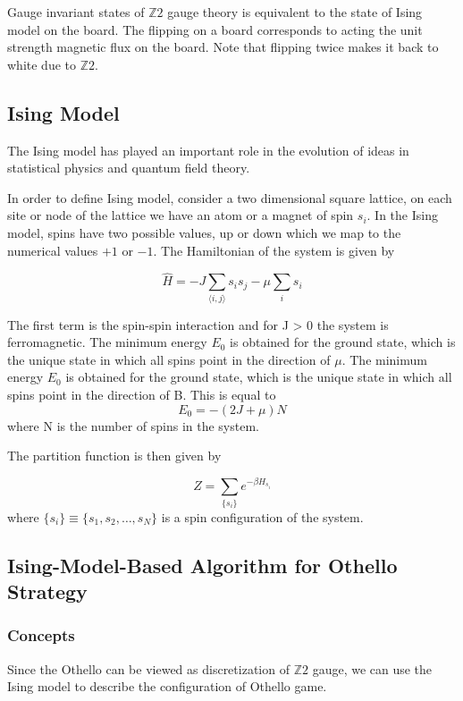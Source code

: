 \documentclass[aps,pra,preprint,amsmath,amssymb,floatfix]{revtex4-2}
\begin{document}
Gauge invariant states of $\mathbb{Z}2$ gauge theory is equivalent to the state of Ising model on the board. The flipping on a board corresponds to acting the unit strength magnetic flux on the board. Note that flipping twice makes it back to white due to $\mathbb{Z}2$. \cite{PhysRevD.96.126001}

\subsection{Ising Model}
The Ising model has played an important role in the evolution of ideas in statistical physics and quantum field theory. 

In order to define Ising model, consider a two dimensional square lattice, on each site or node of the lattice we have an atom or a magnet of spin $s_i$. In the Ising model, spins have two possible values, up or down which we map to the numerical values $+1$ or $-1$. The Hamiltonian of the system is given by

\begin{equation}
    \hat{H}=-J\sum_{\langle i,j\rangle}s_is_j-\mu\sum_is_i
\end{equation}

The first term is the spin-spin interaction and for J > 0 the system is ferromagnetic. The minimum energy $E_0$ is obtained for the ground state, which is the unique state in which all spins point in the direction of $\mu$. The minimum energy $E_0$ is obtained for the ground state, which is the unique state in which all spins point in the direction of B. This is equal to
\begin{equation}
    E_0=-(2J+\mu)N
\end{equation}
where N is the number of spins in the system.

The partition function is then given by

\begin{equation}
    Z=\sum_{\{s_i\}}e^{-\beta H_{s_i}}
\end{equation}
where $\{s_i\}\equiv \{s_1,s_2,\dots,s_N\}$ is a spin configuration of the system.

\subsection{Ising-Model-Based Algorithm for Othello Strategy}
\subsubsection{Concepts}
Since the Othello can be viewed as discretization of $\mathbb{Z}2$ gauge, we can use the Ising model to describe the configuration of Othello game. 
\end{document}
